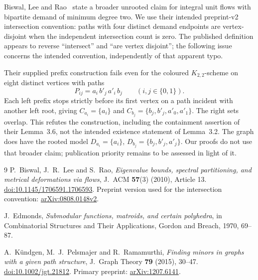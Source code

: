 \documentclass[11pt]{amsart}
\begin{document}
Biswal, Lee and Rao~\cite[Lemma 3.2]{BLR} state a broader unrooted claim
for integral unit flows with bipartite demand of minimum degree two.
We use their intended preprint-v2 intersection convention: paths with
four distinct demand endpoints are vertex-disjoint when the independent
intersection count is zero. The published definition appears to reverse
``intersect'' and ``are vertex disjoint''; the following issue concerns
the intended convention, independently of that apparent typo.

Their supplied prefix construction fails even for the coloured
$K_{2,2}$-scheme on eight distinct vertices with paths
\[
 P_{ij}=a_i\,b'_j\,a'_i\,b_j\qquad(i,j\in\{0,1\}).
\]
Each left prefix stops strictly before its first vertex on a path
incident with another left root, giving $C_{a_i}=\{a_i\}$ and
$C_{b_j}=\{b_j,b'_j,a'_0,a'_1\}$. The right sets overlap. This refutes
the construction, including the containment assertion of their
Lemma~3.6, not the intended existence statement of Lemma~3.2. The graph
does have the rooted model $D_{a_i}=\{a_i\}$,
$D_{b_j}=\{b_j,b'_j,a'_j\}$. Our proofs do not use that broader claim;
publication priority remains to be assessed in light of it.

\begin{thebibliography}{9}
P.~Biswal, J.~R.~Lee and S.~Rao,
\emph{Eigenvalue bounds, spectral partitioning, and metrical deformations
via flows}, J.~ACM \textbf{57}(3) (2010), Article 13.
\href{https://doi.org/10.1145/1706591.1706593}{doi:10.1145/1706591.1706593}.
Preprint version used for the intersection convention:
\href{https://arxiv.org/abs/0808.0148v2}{arXiv:0808.0148v2}.

J.~Edmonds, \emph{Submodular functions, matroids, and certain polyhedra},
in Combinatorial Structures and Their Applications, Gordon and Breach,
1970, 69--87.

A.~K\"undgen, M.~J.~Pelsmajer and R.~Ramamurthi,
\emph{Finding minors in graphs with a given path structure},
J.~Graph Theory \textbf{79} (2015), 30--47.
\href{https://doi.org/10.1002/jgt.21812}{doi:10.1002/jgt.21812}.
Primary preprint: \href{https://arxiv.org/abs/1207.6141}{arXiv:1207.6141}.
\end{thebibliography}
\end{document}
